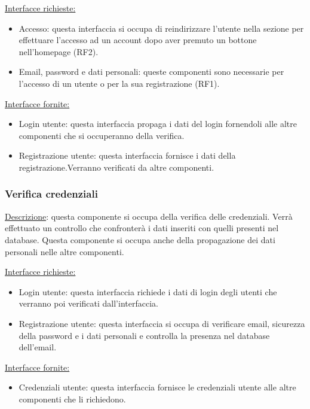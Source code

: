 \documentclass[a4paper,12pt]{article}
\begin{document}
\underline{Interfacce richieste:} 
\begin{itemize}
    \item Accesso: questa interfaccia si occupa di reindirizzare l'utente nella sezione per effettuare l'accesso ad un account dopo aver premuto un bottone nell'homepage (RF2).
    \item Email, password e dati personali: queste componenti sono necessarie per l'accesso di un utente o per la sua registrazione (RF1).
\end{itemize}

\underline{Interfacce fornite:} 
\begin{itemize}
    \item Login utente: questa interfaccia propaga i dati del login fornendoli alle altre componenti che si occuperanno della verifica.
    
    \item Registrazione utente: questa interfaccia fornisce i dati della registrazione.Verranno verificati da altre componenti.
\end{itemize} 



\subsubsection{Verifica credenziali}
\underline{Descrizione}: questa componente si occupa della verifica delle credenziali. Verrà effettuato un controllo che confronterà i dati inseriti con quelli presenti nel database. Questa componente si occupa anche della propagazione dei dati personali nelle altre componenti.

\underline{Interfacce richieste:} 
\begin{itemize}
    \item Login utente: questa interfaccia richiede i dati di login degli utenti che verranno poi verificati dall'interfaccia.
    \item Registrazione utente: questa interfaccia si occupa di verificare email, sicurezza della password e i dati personali e controlla la presenza nel database dell'email.   
\end{itemize}

\underline{Interfacce fornite:} 
\begin{itemize}
    \item Credenziali utente: questa interfaccia fornisce le credenziali utente alle altre componenti che li richiedono.
\end{itemize} 
\end{document}
